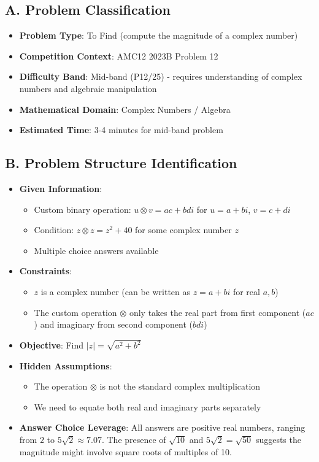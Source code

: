 \documentclass[12pt]{article}
\begin{document}
\begin{problemconfigbox}
\subsection*{A. Problem Classification}
\begin{itemize}[leftmargin=*]
    \item \textbf{Problem Type}: To Find (compute the magnitude of a complex number)
    \item \textbf{Competition Context}: AMC12 2023B Problem 12
    \item \textbf{Difficulty Band}: Mid-band (P12/25) - requires understanding of complex numbers and algebraic manipulation
    \item \textbf{Mathematical Domain}: Complex Numbers / Algebra
    \item \textbf{Estimated Time}: 3-4 minutes for mid-band problem
\end{itemize}

\subsection*{B. Problem Structure Identification}
\begin{itemize}[leftmargin=*]
    \item \textbf{Given Information}: 
    \begin{itemize}
        \item Custom binary operation: $u \otimes v = ac + bdi$ for $u = a+bi$, $v = c+di$
        \item Condition: $z \otimes z = z^2 + 40$ for some complex number $z$
        \item Multiple choice answers available
    \end{itemize}
    \item \textbf{Constraints}: 
    \begin{itemize}
        \item $z$ is a complex number (can be written as $z = a+bi$ for real $a,b$)
        \item The custom operation $\otimes$ only takes the real part from first component ($ac$) and imaginary from second component ($bdi$)
    \end{itemize}
    \item \textbf{Objective}: Find $|z| = \sqrt{a^2+b^2}$
    \item \textbf{Hidden Assumptions}: 
    \begin{itemize}
        \item The operation $\otimes$ is not the standard complex multiplication
        \item We need to equate both real and imaginary parts separately
    \end{itemize}
    \item \textbf{Answer Choice Leverage}: All answers are positive real numbers, ranging from $2$ to $5\sqrt{2} \approx 7.07$. The presence of $\sqrt{10}$ and $5\sqrt{2} = \sqrt{50}$ suggests the magnitude might involve square roots of multiples of 10.
\end{itemize}


\end{problemconfigbox}
\end{document}
